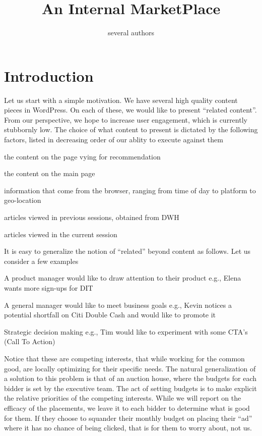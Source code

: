 \documentclass[letterpaper,12pt]{article}
\begin{document}
\title{An Internal MarketPlace}
\author{several authors}
\maketitle
\thispagestyle{fancy}
\lhead{}
\chead{}
\rhead{}
\cfoot{}
\rfoot{{\small \thepage}}

\section{Introduction}

Let us start with a simple motivation. We have several high quality content
pieces in WordPress. On each of these, we would like to present ``related
content''. From our perspective, we hope to increase user engagement, which is
currently stubbornly low.  The choice of what content to present is dictated
by the following factors, listed in decreasing order of our ablity to execute
against them

\be
\item the content on the page vying for recommendation
\item the content on the main page 
\item information that come from the browser, ranging from
time of day to platform to geo-location
\item articles viewed in previous sessions, obtained from DWH
\item articles viewed in the current session
\ee

It is easy to generalize the notion of ``related'' beyond content as follows.
Let us consider a few examples
\be
\item A product manager would like to draw attention to their product e.g.,
  Elena wants more sign-ups for DIT
\item A general manager would like to meet business goals e.g., Kevin notices a
  potential shortfall on Citi Double Cash and would like to promote it
\item Strategic decision making e.g., Tim would like to experiment with some
  CTA's (Call To Action) 
  \ee

Notice that these are competing interests, that while working for the common
good, are locally optimizing for their specific needs.  The natural 
generalization of a solution to this problem is that of an auction house, where
the budgets for each bidder is set by the executive team. The act of setting
budgets is to make explicit the relative priorities of the competing interests.
While we will report on the efficacy of the placements, we leave it to each
bidder to determine what is good for them. If they choose to squander their
monthly budget on placing their ``ad'' where it has no chance of being clicked,
that is for them to worry about, not us. 
\end{document}
